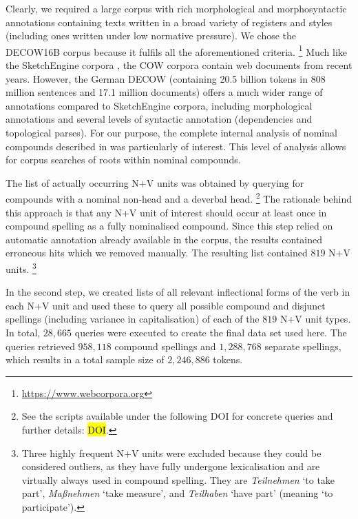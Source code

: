 \documentclass[biblatex, charis, linguex]{glossa}\usepackage{knitr}
\begin{document}
Clearly, we required a large corpus with rich morphological and morphosyntactic annotations containing texts written in a broad variety of registers and styles (including ones written under low normative pressure).
We chose the DECOW16B corpus \parencite{SchaeferBildhauer2012a} because it fulfils all the aforementioned criteria.%
\footnote{\url{https://www.webcorpora.org}}
Much like the SketchEngine corpora \parencite{KilgarriffEa2014}, the COW corpora contain web documents from recent years.
However, the German DECOW (containing 20.5 billion tokens in 808 million sentences and 17.1 million documents) offers a much wider range of annotations compared to SketchEngine corpora, including morphological annotations and several levels of syntactic annotation (dependencies and topological parses).
For our purpose, the complete internal analysis of nominal compounds described in \citet{SchaeferPankratz2018} was particularly of interest.
This level of analysis allows for corpus searches of roots within nominal compounds.

The list of actually occurring N+V units was obtained by querying for compounds with a nominal non-head and a deverbal head.%
\footnote{See the scripts available under the following DOI for concrete queries and further details: \hl{DOI}.}
The rationale behind this approach is that any N+V unit of interest should occur at least once in compound spelling as a fully nominalised compound.
Since this step relied on automatic annotation already available in the corpus, the results contained erroneous hits which we removed manually.
The resulting list contained $819$ N+V units.%
\footnote{Three highly frequent N+V units were excluded because they could be considered outliers, as they have fully undergone lexicalisation and are virtually always used in compound spelling.
They are \textit{Teilnehmen} `to take part', \textit{Maßnehmen} `take measure', and \textit{Teilhaben} `have part' (meaning `to participate').}

In the second step, we created lists of all relevant inflectional forms of the verb in each N+V unit and used these to query all possible compound and disjunct spellings (including variance in capitalisation) of each of the $819$ N+V unit types.
In total, $28,665$ queries were executed to create the final data set used here.
The queries retrieved $958,118$ compound spellings and $1,288,768$ separate spellings, which results in a total sample size of $2,246,886$ tokens.
\end{document}
